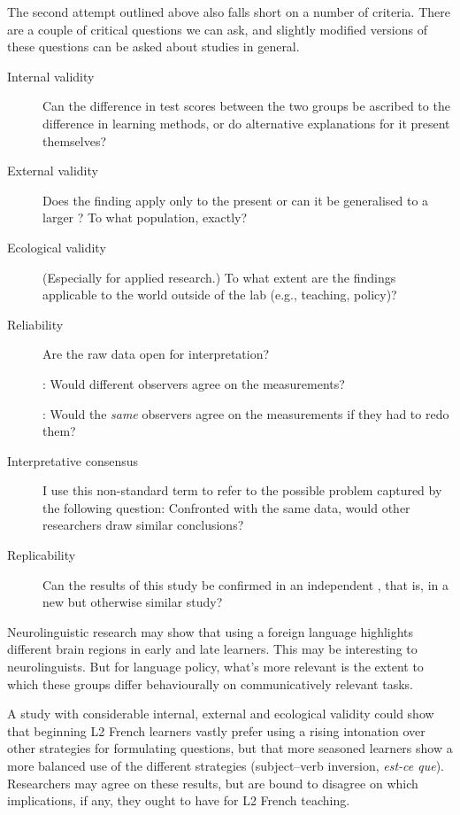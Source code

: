 The second attempt outlined above also falls short on a number of criteria.
There are a couple of critical questions we can ask, and slightly modified
versions of these questions can be asked about studies in general.

\begin{description}
 \item[Internal validity]
 Can the difference in test scores between the two groups
 be ascribed to the difference in learning methods,
 or do alternative explanations for it present themselves?

 \item[External validity]
 Does the finding apply only to the present 
 or can it be generalised to a larger ?
 To what population, exactly?

 \item[Ecological validity]
 (Especially for applied research.)
 To what extent are the findings applicable
 to the world outside of the lab
 (e.g., teaching, policy)?
 
 \item[Reliability]
  Are the raw data open for interpretation?
 
 : Would different observers agree on the measurements?
 
 : Would the \emph{same} observers agree on the measurements if they had to redo them?
 
  \item[Interpretative consensus]
  I use this non-standard term to refer to the possible problem captured
  by the following question:
 Confronted with the same data, would other researchers draw similar conclusions?

 \item[Replicability]
 Can the results of this study be confirmed
 in an independent ,
 that is, in a new but otherwise similar study?
\end{description}

  Neurolinguistic research may show that using a foreign language highlights
  different brain regions in early and late learners.
  This may be interesting to neurolinguists.
  But for language policy, what's more relevant is the extent to which
  these groups differ behaviourally on communicatively relevant tasks.
\parend

A study with considerable internal, external and ecological validity could show
that beginning L2 French learners vastly prefer using a rising intonation 
over other strategies
for formulating questions, but that more seasoned learners show a more balanced
use of the different strategies (subject--verb inversion, \textit{est-ce que}). 
Researchers may agree on these results, 
but are bound to disagree on which implications, 
if any, they ought to have for L2 French teaching. 

